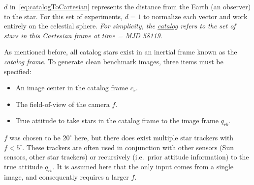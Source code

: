 $d$ in~\autoref{eq:catalogToCartesian} represents the distance from the Earth (an observer) to the star.
For this set of experiments, $d = 1$ to normalize each vector and work entirely on the celestial sphere.
\textit{For simplicity, the \underline{catalog} refers to the set of stars in this Cartesian frame at time = MJD 58119.}

As mentioned before, all catalog stars exist in an inertial frame known as the \textit{catalog frame}.
To generate clean benchmark images, three items must be specified:
\begin{itemize}
    \item An image center in the catalog frame $c_r$.
    \item The field-of-view of the camera $f$.
    \item True attitude to take stars in the catalog frame to the image frame $q_{rb}$.
\end{itemize}

$f$ was chosen to be $20^\circ$ here, but there does exist multiple star trackers with $f < 5^\circ$.
These trackers are often used in conjunction with other sensors (Sun sensors, other star trackers) or recursively
(i.e.\ prior attitude information) to the true attitude $q_{rb}$.
It is assumed here that the only input comes from a single image, and consequently requires a larger $f$.

\begin{figure}
\end{figure}

